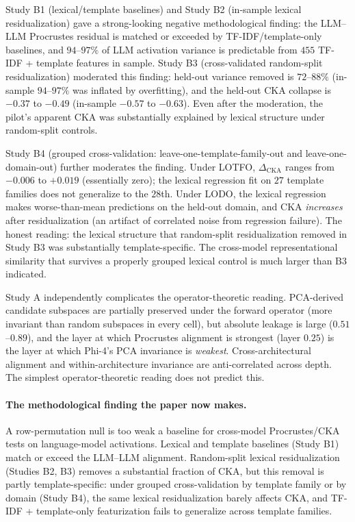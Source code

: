 Study B1 (lexical/template baselines) and Study B2 (in-sample lexical
residualization) gave a strong-looking negative methodological
finding: the LLM--LLM Procrustes residual is matched or exceeded by
TF-IDF/template-only baselines, and $94$--$97\%$ of LLM activation
variance is predictable from $455$ TF-IDF + template features in
sample. Study B3 (cross-validated random-split residualization)
moderated this finding: held-out variance removed is $72$--$88\%$
(in-sample $94$--$97\%$ was inflated by overfitting), and the
held-out CKA collapse is $-0.37$ to $-0.49$ (in-sample $-0.57$ to
$-0.63$). Even after the moderation, the pilot's apparent CKA was
substantially explained by lexical structure under random-split
controls.

Study B4 (grouped cross-validation: leave-one-template-family-out and
leave-one-domain-out) further moderates the finding. Under LOTFO,
$\Delta_\text{CKA}$ ranges from $-0.006$ to $+0.019$ (essentially
zero); the lexical regression fit on $27$ template families does not
generalize to the $28$th. Under LODO, the lexical regression makes
worse-than-mean predictions on the held-out domain, and CKA
\emph{increases} after residualization (an artifact of correlated
noise from regression failure). The honest reading: the lexical
structure that random-split residualization removed in Study B3 was
substantially template-specific. The cross-model representational
similarity that survives a properly grouped lexical control is much
larger than B3 indicated.

Study A independently complicates the operator-theoretic reading.
PCA-derived candidate subspaces are partially preserved under the
forward operator (more invariant than random subspaces in every
cell), but absolute leakage is large ($0.51$--$0.89$), and the layer
at which Procrustes alignment is strongest (layer $0.25$) is the
layer at which Phi-4's PCA invariance is \emph{weakest}.
Cross-architectural alignment and within-architecture invariance
are anti-correlated across depth. The simplest operator-theoretic
reading does not predict this.

\paragraph{The methodological finding the paper now makes.}

A row-permutation null is too weak a baseline for cross-model
Procrustes/CKA tests on language-model activations. Lexical and
template baselines (Study B1) match or exceed the LLM--LLM alignment.
Random-split lexical residualization (Studies B2, B3) removes a
substantial fraction of CKA, but this removal is partly
template-specific: under grouped cross-validation by template family
or by domain (Study B4), the same lexical residualization barely
affects CKA, and TF-IDF + template-only featurization fails to
generalize across template families.

